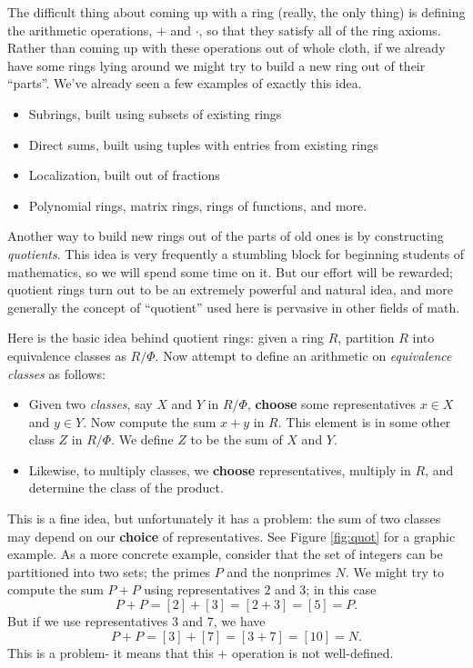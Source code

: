 \documentclass{article}
\begin{document}

The difficult thing about coming up with a ring (really, the only thing) is defining the arithmetic operations, $+$ and $\cdot$, so that they satisfy all of the ring axioms. Rather than coming up with these operations out of whole cloth, if we already have some rings lying around we might try to build a new ring out of their ``parts''. We've already seen a few examples of exactly this idea.
\begin{itemize}
\item Subrings, built using subsets of existing rings
\item Direct sums, built using tuples with entries from existing rings
\item Localization, built out of fractions
\item Polynomial rings, matrix rings, rings of functions, and more.
\end{itemize}
Another way to build new rings out of the parts of old ones is by constructing \emph{quotients}. This idea is very frequently a stumbling block for beginning students of mathematics, so we will spend some time on it. But our effort will be rewarded; quotient rings turn out to be an extremely powerful and natural idea, and more generally the concept of ``quotient'' used here is pervasive in other fields of math.

Here is the basic idea behind quotient rings: given a ring $R$, partition $R$ into equivalence classes as $R/\Phi$. Now attempt to define an arithmetic on \emph{equivalence classes} as follows:
\begin{itemize}
\item Given two \emph{classes}, say $X$ and $Y$ in $R/\Phi$, \textbf{choose} some representatives $x \in X$ and $y \in Y$. Now compute the sum $x+y$ in $R$. This element is in some other class $Z$ in $R/\Phi$. We define $Z$ to be the sum of $X$ and $Y$.
\item Likewise, to multiply classes, we \textbf{choose} representatives, multiply in $R$, and determine the class of the product.
\end{itemize}

This is a fine idea, but unfortunately it has a problem: the sum of two classes may depend on our \textbf{choice} of representatives. See Figure \ref{fig:quot} for a graphic example. As a more concrete example, consider that the set of integers can be partitioned into two sets; the primes $P$ and the nonprimes $N$. We might try to compute the sum $P+P$ using representatives $2$ and $3$; in this case \[ P + P = [2] + [3] = [2+3] = [5] = P. \] But if we use representatives 3 and 7, we have \[ P + P = [3] + [7] = [3+7] = [10] = N. \] This is a problem- it means that this $+$ operation is not well-defined.
\end{document}
